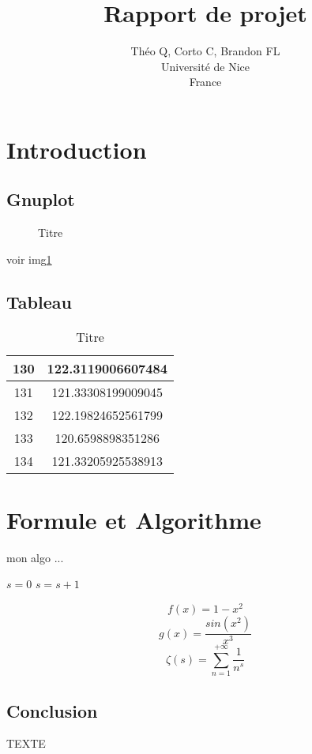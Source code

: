 \documentclass{article}
\title{Rapport de projet}
\author{Théo Q, Corto C, Brandon FL \\
Université de Nice\\
France}
\begin{document}
\maketitle


\section{Introduction}



\subsection{Gnuplot}
\begin{figure}[h]
\centering
\caption{Titre}
\label{fig:toto}
\end{figure}
voir img\ref{fig:toto}

\subsection{Tableau}
\begin{table}[h]
\centering
\begin{tabular}{|c|c|}
\hline 
130 & 122.3119006607484 \\ 
\hline 
131 & 121.33308199009045 \\ 
\hline 
132 & 122.19824652561799 \\ 
\hline 
133 & 120.6598898351286 \\ 
\hline 
134 & 121.33205925538913 \\ 
\hline 
\end{tabular} 
\caption{Titre}
\label{tab:toto2}
\end{table}


\section{Formule et Algorithme}
\begin{algorithm}[H]
\caption{mon algo ...}
\begin{algorithmic}[1]
\STATE $s =0$
\STATE $s= s + 1$
\ENDIF
\ENDFOR
\end{algorithmic}
\end{algorithm}

\begin{equation}
f(x)=1 - x^2
\end{equation}
\begin{equation}
g(x)=\frac{sin(x^2)}{x^3}
\end{equation}
\begin{equation}
\zeta(s)= \sum_{n=1}^{+\infty}\frac1{n^s}
\end{equation}

\subsection{Conclusion}
TEXTE
\end{document}
